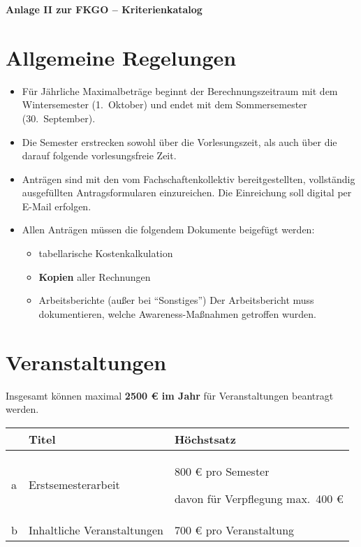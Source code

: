 \documentclass{article}
\begin{document}
\noindent
\begin{center}
    \huge \textbf{Anlage II zur FKGO -- Kriterienkatalog}
\end{center}

\section{Allgemeine Regelungen}
    \begin{itemize}
        \item Für Jährliche Maximalbeträge beginnt der Berechnungszeitraum mit dem Wintersemester (1.\ Oktober) und endet mit dem Sommersemester (30.\ September).
        \item Die Semester erstrecken sowohl über die Vorlesungszeit, als auch über die darauf folgende vorlesungsfreie Zeit.
        \item Anträgen sind mit den vom Fachschaftenkollektiv bereitgestellten, vollständig ausgefüllten Antragsformularen einzureichen. 
        	Die Einreichung soll digital per E-Mail erfolgen.
        \item Allen Anträgen müssen die folgendem Dokumente beigefügt werden:
        \begin{itemize}
            \item tabellarische Kostenkalkulation
            \item \textbf{Kopien} aller Rechnungen
            \item Arbeitsberichte (außer bei  "`Sonstiges"')
            	Der Arbeitsbericht muss dokumentieren, welche Awareness-Maßnahmen getroffen wurden.
        \end{itemize}
    \end{itemize}

\section{Veranstaltungen}
    Insgesamt können maximal \textbf{2500 € im Jahr} für Veranstaltungen beantragt werden. \\
    
    \setlength\extrarowheight{2mm} \sffamily    
    \begin{tabular}{l||L{6cm}|L{7cm}}

         &\textbf{Titel}  & \textbf{Höchstsatz} \\[1mm] \hline \hline
         a&
         Erstsemesterarbeit &
         800 € pro Semester\par
         davon für Verpflegung max.\ 400 € \\[1mm] \hline
          
        b&
        Inhaltliche Veranstaltungen & 
        700 € pro Veranstaltung \\[1mm]
        
    \end{tabular}
    \rmfamily
\end{document}
